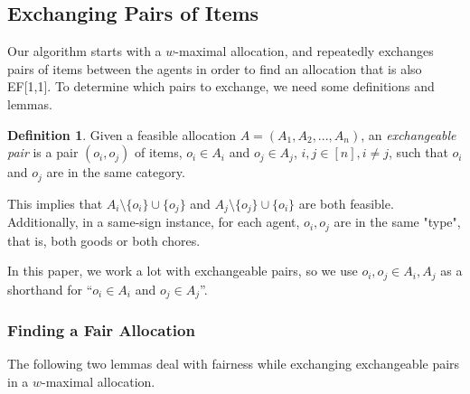\documentclass[sigconf]{aamas}
\theoremstyle{definition}
\newtheorem{definition}[theorem]{Definition}
\begin{document}
\subsection{Exchanging Pairs of Items}
Our algorithm starts with a $w$-maximal allocation, and repeatedly exchanges pairs of items between the agents in order to find an allocation that is also EF[1,1]. To determine which pairs to exchange, we need some definitions and lemmas.

\begin{definition}
Given a feasible allocation $A = (A_1,A_2,...,A_n)$, an \emph{exchangeable pair} is a pair $(o_i,o_j)$ of items, $o_i\in A_i$ and $o_j\in A_j$, $i,j\in [n], i\neq j$, 
such that 
$o_i$ and $o_j$ are in the same category.

This implies that $A_i\setminus \{o_i\}\cup \{o_j\}$
and $A_j\setminus \{o_j\}\cup \{o_i\}$ are both feasible. Additionally, in a same-sign instance, 
for each agent, $o_i, o_j$ are in the same "type", 
that is, both goods or both chores.
\end{definition}

In this paper, we work a lot with exchangeable pairs, so we use
$o_i,o_j \in A_i,A_j$ as a shorthand for ``$o_i\in A_i$ and $o_j\in A_j$''.

\subsubsection{Finding a Fair Allocation}

The following two lemmas deal with fairness while exchanging exchangeable pairs in a $w$-maximal allocation.
\end{document}
